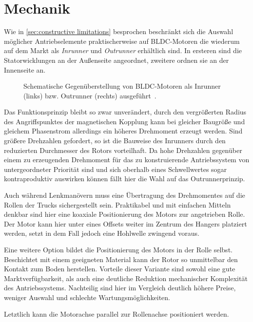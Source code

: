 \chapter{Mechanik}
	Wie in \cref{sec:constructive limitations} besprochen beschränkt sich die Auswahl möglicher Antriebselemente praktischerweise auf BLDC-Motoren die wiederum auf dem Markt als \textit{Inrunner} und \textit{Outrunner} erhältlich sind.
	In ersteren sind die Statorwicklungen an der Außenseite angeordnet, zweitere ordnen sie an der Innenseite an.
	\begin{figure}[h]
		\centering
		
		\caption[Gegenüberstellung von Inrunner und Outrunner]{Schematische Gegenüberstellung von BLDC-Motoren als Inrunner (links) bzw. Outrunner (rechts) ausgeführt~\cite{inrunner.outrunner.2022}.}
		\label{fig:inrunner outrunner}
	\end{figure}
	Das Funktionsprinzip bleibt so zwar unverändert, durch den vergrößerten Radius des Angriffspunktes der magnetischen Kopplung kann bei gleicher Baugröße und gleichem Phasenstrom allerdings ein höheres Drehmoment erzeugt werden.
	Sind größere Drehzahlen gefordert, so ist die Bauweise des Inrunners durch den reduzierten Durchmesser des Rotors vorteilhaft.
	Da hohe Drehzahlen gegenüber einem zu erzeugenden Drehmoment für das zu konstruierende Antriebssystem von untergeordneter Priorität sind und sich oberhalb eines Schwellwertes sogar kontraproduktiv auswirken können fällt hier die Wahl auf das Outrunnerprinzip.\par\medskip
	Auch während Lenkmanövern muss eine Übertragung des Drehmomentes auf die Rollen der Trucks sichergestellt sein.
	Praktikabel und mit einfachen Mitteln denkbar sind hier eine koaxiale Positionierung des Motors zur angetrieben Rolle.
	Der Motor kann hier unter eines Offsets weiter im Zentrum des Hangers platziert werden, setzt in dem Fall jedoch eine Hohlwelle zwingend voraus.\par
	Eine weitere Option bildet die Positionierung des Motors in der Rolle selbst.
	Beschichtet mit einem geeigneten Material kann der Rotor so unmittelbar den Kontakt zum Boden herstellen.
	Vorteile dieser Variante sind sowohl eine gute Marktverfügbarkeit, als auch eine deutliche Reduktion mechanischer Komplexität des Antriebssystems.
	Nachteilig sind hier im Vergleich deutlich höhere Preise, weniger Auswahl und schlechte Wartungsmöglichkeiten.\par
	Letztlich kann die Motorachse parallel zur Rollenachse positioniert werden.
